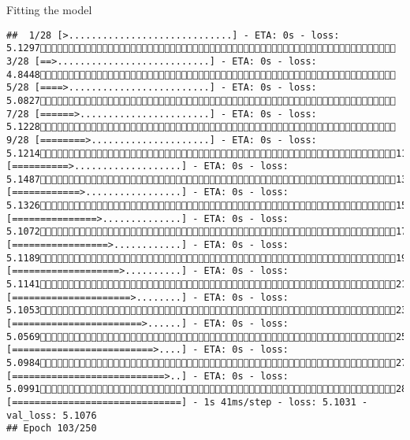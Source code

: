 \documentclass[
  ignorenonframetext,
]{beamer}
\begin{document}
\begin{frame}[fragile]{Fitting the model}
\begin{verbatim}
##  1/28 [>.............................] - ETA: 0s - loss: 5.1297 3/28 [==>...........................] - ETA: 0s - loss: 4.8448 5/28 [====>.........................] - ETA: 0s - loss: 5.0827 7/28 [======>.......................] - ETA: 0s - loss: 5.1228 9/28 [========>.....................] - ETA: 0s - loss: 5.121411/28 [==========>...................] - ETA: 0s - loss: 5.148713/28 [============>.................] - ETA: 0s - loss: 5.132615/28 [===============>..............] - ETA: 0s - loss: 5.107217/28 [=================>............] - ETA: 0s - loss: 5.118919/28 [===================>..........] - ETA: 0s - loss: 5.114121/28 [=====================>........] - ETA: 0s - loss: 5.105323/28 [=======================>......] - ETA: 0s - loss: 5.056925/28 [=========================>....] - ETA: 0s - loss: 5.098427/28 [===========================>..] - ETA: 0s - loss: 5.099128/28 [==============================] - 1s 41ms/step - loss: 5.1031 - val_loss: 5.1076
## Epoch 103/250

\end{verbatim}
\end{frame}
\end{document}
